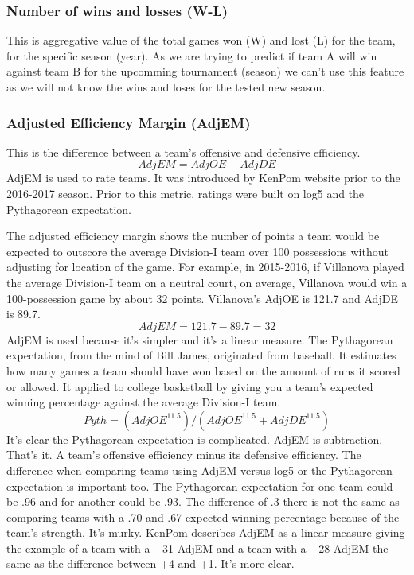 \documentclass[
10pt, %
a4paper, %
oneside, %
headinclude,footinclude, %
BCOR5mm, %
]{scrartcl}
\begin{document}
\subsubsection{Number of wins and losses (W-L)}
This is aggregative value of the total games won (W) and lost (L) for the team, for the specific season (year). As we are trying to predict if team A will win against team B for the upcomming tournament (season) we can't use this feature as we will not know the wins and loses for the tested new season.
\subsubsection{Adjusted Efficiency Margin (AdjEM)}
This is the difference between a team’s offensive and defensive efficiency.
\[AdjEM = AdjOE - AdjDE\]
AdjEM is used to rate teams. It was introduced by KenPom website prior to the 2016-2017 season. Prior to this metric, ratings were built on log5 and the Pythagorean expectation.

The adjusted efficiency margin shows the number of points a team would be expected to outscore the average Division-I team over 100 possessions without adjusting for location of the game.
For example, in 2015-2016, if Villanova played the average Division-I team on a neutral court, on average, Villanova would win a 100-possession game by about 32 points.
Villanova's AdjOE is 121.7 and AdjDE is 89.7.\[AdjEM = 121.7 - 89.7 = 32\] AdjEM is used because it's simpler and it's a linear measure.
The Pythagorean expectation, from the mind of Bill James, originated from baseball. It estimates how many games a team should have won based on the amount of runs it scored or allowed.
It applied to college basketball by giving you a team's expected winning percentage against the average Division-I team.\[Pyth = (AdjOE^{11.5}) / (AdjOE^{11.5} + AdjDE^{11.5})\]
It's clear the Pythagorean expectation is complicated. AdjEM is subtraction. That's it. A team's offensive efficiency minus its defensive efficiency.
The difference when comparing teams using AdjEM versus log5 or the Pythagorean expectation is important too. The Pythagorean expectation for one team could be .96 and for another could be .93. The difference of .3 there is not the same as comparing teams with a .70 and .67 expected winning percentage because of the team's strength. It's murky.
KenPom describes AdjEM as a linear measure giving the example of a team with a +31 AdjEM and a team with a +28 AdjEM the same as the difference between +4 and +1. It's more clear.\cite{adjem}
\end{document}
